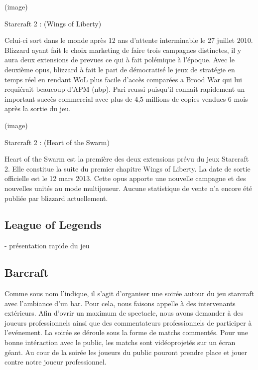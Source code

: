   (image)

Starcraft 2 : (Wings of Liberty)

  Celui-ci sort dans le monde après 12 ans d'attente
  interminable le 27 juillet 2010. Blizzard ayant fait le choix marketing
  de faire trois campagnes distinctes, il y aura deux extensions de
  prevues ce qui à fait polémique à l'époque. Avec le deuxième opus,
  blizzard à fait le pari de démocratisé le jeux de stratégie en temps
  réel en rendant WoL plus facile d'accès comparées a Brood War qui lui
  requiérait beaucoup d'APM (nbp). Pari reussi puisqu'il connait
  rapidement un important succès commercial avec plus de 4,5 millions de
  copies vendues 6 mois après la sortie du jeu.

  (image)

Starcraft 2 : (Heart of the Swarm)

  Heart of the Swarm est la première des deux extensions prévu
  du jeux Starcraft 2. Elle constitue la suite du premier chapitre Wings
  of Liberty. La date de sortie officielle est le 12 mars 2013. Cette opus
  apporte une nouvelle campagne et des nouvelles unités au mode
  multijoueur. Aucune statistique de vente n'a encore été publiée par
  blizzard actuellement.


\subsection{League of Legends}%
\label{sub:league_of_legends}

- présentation rapide du jeu

\subsection{Barcraft}%
\label{sub:barcraft}

Comme sous nom l'indique, il s'agit d'organiser une soirée autour
du jeu starcraft avec l'ambiance d'un bar.	Pour cela, nous faisons
appelle à des intervenants extérieurs. Afin d'ovrir un maximum de
spectacle, nous avons demander à des joueurs professionnels ainsi
que des commentateurs professionnels de participer à l'evénement.
La soirée se déroule sous la forme de matchs commentés. Pour une
bonne intéraction avec le public, les matchs sont vidéoprojetés sur
un écran géant. Au cour de la soirée les joueurs du public pouront
prendre place et jouer contre notre joueur professionnel.

